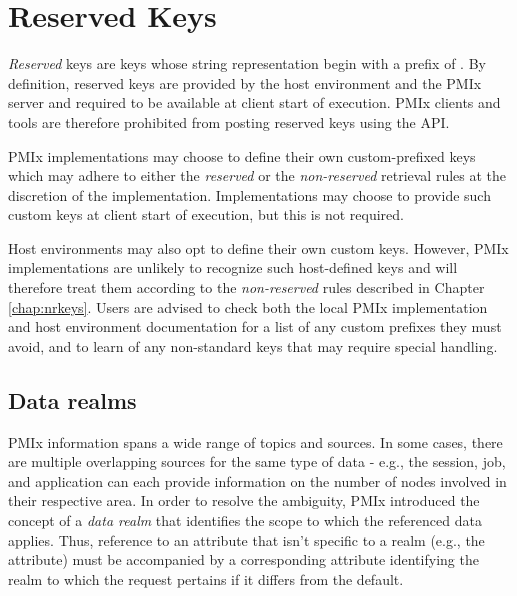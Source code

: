 \chapter{Reserved Keys}
\label{chap:api_rsvd_keys}


\emph{Reserved} keys are keys whose string representation begin with a prefix of
. By definition, reserved keys are provided by the host
environment and the \ac{PMIx} server and required to be available at client
start of execution. \ac{PMIx} clients and tools are therefore prohibited from
posting reserved keys using the  \ac{API}.

\ac{PMIx} implementations may choose to define their own
custom-prefixed keys which may adhere to either the \emph{reserved} or the \emph{non-reserved} retrieval rules at the discretion of the implementation. Implementations may choose to provide such custom keys at client start of execution, but this is not required.

Host environments may also opt to define their own custom keys. However, \ac{PMIx} implementations are unlikely to recognize such host-defined keys and will therefore treat them according to the \emph{non-reserved} rules described in Chapter \ref{chap:nrkeys}. Users
are advised to check both the local \ac{PMIx} implementation and host environment documentation
for a list of any custom prefixes they must avoid, and to learn of any non-standard keys that may require special handling.


\section{Data realms}
\label{api:struct:attributes:retrieval}

\ac{PMIx} information spans a wide range of topics and sources. In some cases,
there are multiple overlapping sources for the same type of data - e.g., the
session, job, and application can each provide information on the number of
nodes involved in their respective area. In order to resolve the ambiguity,
\ac{PMIx} introduced the concept of a \emph{data realm}
that identifies the scope to which the referenced data applies. Thus, reference
to an attribute that isn't specific to a realm (e.g., the
 attribute) must be accompanied by a corresponding
attribute identifying the realm to which the request pertains if it differs
from the default.

